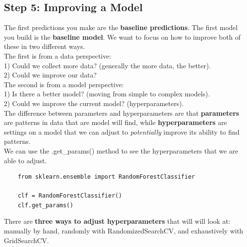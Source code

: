 \documentclass[11pt, a4paper]{article}
\begin{document}
\begin{spacing}{1.1}
	\subsection{Step 5: Improving a Model}
	The first predictions you make are the \textbf{baseline predictions}. The first model you build is the \textbf{baseline model}. We want to focus on how to improve both of these in two different ways. \vspace*{1mm} \\
	The first is from a data perspective: \\
	\hspace*{2mm} 1) Could we collect more data? (generally the more data, the better). \\
	\hspace*{2mm} 2) Could we improve our data? \vspace*{1mm} \\
	The second is from a model perspective: \\
	\hspace*{2mm} 1) Is there a better model? (moving from simple to complex models). \\
	\hspace*{2mm} 2) Could we improve the current model? (hyperparameters). \vspace*{1mm} \\
	The difference between parameters and hyperparameters are that \textbf{parameters} are patterns in data that are model will find, while \textbf{hyperparameters} are settings on a model that we can adjust to \textit{potentially} improve its ability to find patterns. \vspace*{2mm} \\ 
	We can use the .get\_params() method to see the hyperparameters that we are able to adjust.
	\begin{lstlisting}
	from sklearn.ensemble import RandomForestClassifier

	clf = RandomForestClassifier()
	clf.get_params()	\end{lstlisting} \vspace*{1mm}
	There are \textbf{three ways to adjust hyperparameters} that will will look at: manually by hand, randomly with RandomizedSearchCV, and exhaustively with GridSearchCV. 

\end{spacing}
\end{document}
